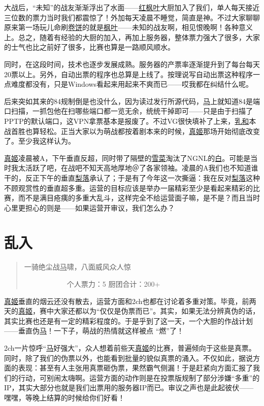 大战后，“未知”的战友渐渐浮出了水面——\uline{红枫叶}大厨加入了我们，单人每天接近三位数的票力当时我们都震惊了！外加每天凌晨不睡觉，简直是神。不过大家聊聊原来第一场玩儿命刷\uline{卷饼}的就是\uline{枫叶}——未知的战友啊，相见恨晚啊！各种意义上。总之，随着有经验的大厨的加入，再加上服务器，整体票力强大了很多，大家的士气也比之前好了很多，比赛也算是一路顺风顺水。

同时，在这段时间，技术也逐步发展成熟。服务器的产票率逐渐提升到了每台每天20票以上。另外，自动出票的程序也总算是上线了。按理说写自动出票这种程序一点难度都没有，只是Windows看起来用起来不爽而已——哎我都在纠结什么呢。

后来突如其来的84规制倒是也没什么，因为读过发行所源代码，\uline{马}上就知道84是端口扫描，一抓包他在扫哪些端口都一览无余，统统干掉即可——只是由于扫描了PPTP的默认端口，这VPN拿票基本是报废了。不过VG很快填补了上来，\uline{乳和}本战首胜也算轻松。正当大家以为萌战都按着剧本来的时候，\uline{真姬}那场开始彻底改变了。至少我这样认为。

\uline{真姬}凌晨被A，下午垂直反超，同时带了隔壁的\uline{雪菜}淘汰了NGNL的\uline{白}。可能是当时我太活跃了吧，在战吧不知天高地厚地＠了各家领袖。凌晨的A我们也不知道谁干的，反正下午的垂直\uline{梨落}承认了；于是有了今年这一次撕逼：我在反对\uline{梨落}这种不顾观赏性的垂直超多重。运营的目标应该是举办一届精彩至少是看起来精彩的比赛，而不是满目疮痍的多重大乱斗，这样完全不给运营面子嘛，是不是？而且当时心里更担心的则是——如果运营开审议，我们怎么办？

\chapter{乱入}
\begin{quote}
一骑绝尘战\uline{马}啸，八面威风众人惊

　　　　　　个人票力：5 厨团合计：200+
\end{quote}

\uline{真姬}垂直的烟云还没有散去，运营方面和2ch也都在讨论着多重对策。毕竟，前两天的\uline{真姬}，赛中大家还都以为“仅仅是伪票而已”。其实，如果无法分辨真伪的话，其实比赛也还是有一定的精彩程度的。于是乎到了这一天，一个大胆的作战计划——垂直伪\uline{马}！一下子，萌战的热情就这样被点 “燃”了！

2ch一片惊呼“\uline{马}好强大”，众人想着前些天\uline{真姬}的比赛，普遍倾向于这些是真票。同时，除了我们的伪票以外，也能看到批量的貌似真票的涌入。不仅如此，据说方面的表现：甚至有人主张用真票砸伪票，果然霸气侧漏！于是赶紧向方面汇报了我们的行动，可别闹太嗨啊。运营方面的动作则是在投票版规制了部分涉嫌“多重”的IP，其实大部分也就是我们出票用的服务器IP而已。审议之声也是此起彼伏——嘿嘿，等晚上结算的时候给你们好看！

